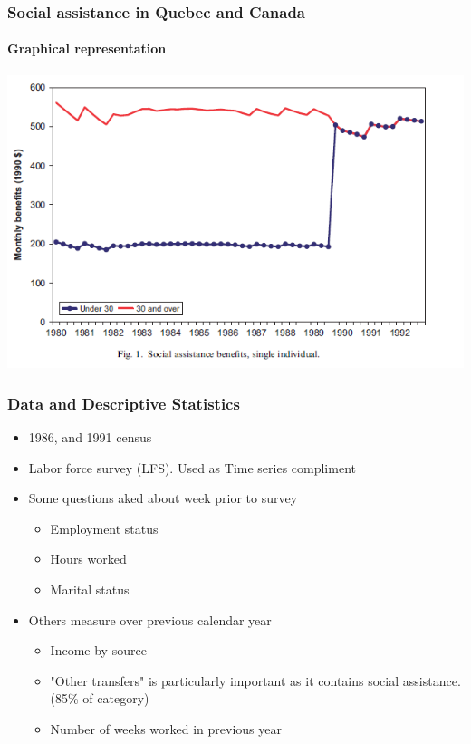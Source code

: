 \documentclass{beamer}
\begin{document}



\begin{frame}
\frametitle{Social assistance in Quebec and Canada}
	\framesubtitle{Graphical representation}
	
	\begin{center}
		\includegraphics[width=.95\linewidth]{fig_1.PNG}
		
	\end{center}
	
\end{frame}








\begin{frame}
\frametitle{Data and Descriptive Statistics }
\begin{itemize}
	\item 1986, and 1991 census 
	\item Labor force survey (LFS). Used as Time series compliment 
	\item Some questions aked about week prior to survey 
	\begin{itemize}
		\item Employment status 
		\item Hours worked 
		\item Marital status 
	\end{itemize}
	\item Others measure over previous calendar year 
	\begin{itemize}
		\item Income by source 
		\item "Other transfers" is particularly important as it contains social assistance. (85\% of category)
		\item Number of weeks worked in previous year 
	\end{itemize}
\end{itemize}
\end{frame}
\end{document}
